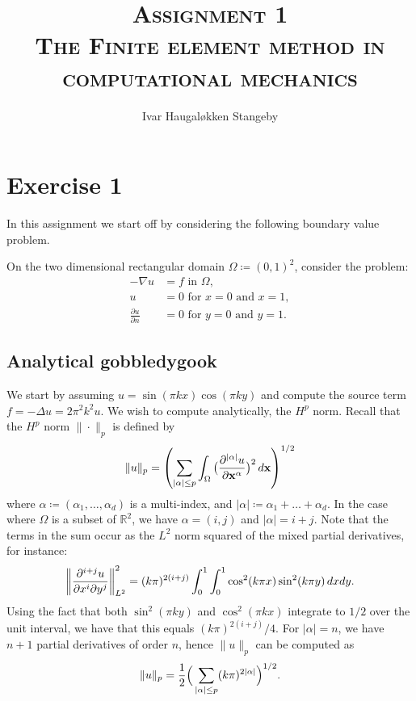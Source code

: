 \documentclass[]{article}
\title{\textsc{Assignment 1 \\ The Finite element method in computational mechanics}}
\author{Ivar Haugaløkken Stangeby}
\newcommand{\lapl}{\Delta}
\newcommand{\x}{\mathbf{x}}
\begin{document}
\maketitle    
\section*{Exercise 1}
\label{sec:formulation_of_problem}

In this assignment we start off by considering the following boundary value
problem.

\begin{BVP}
    \label{bvp:one}
    On the two dimensional rectangular domain $\Omega \coloneqq (0, 1)^2$, consider the
    problem:
    \begin{align}
        \label{eq:problem}
        -\nabla u &= f \text{ in } \Omega,\\ 
        u &= 0 \text{ for } x = 0 \text{ and } x = 1,\\
        \frac{\partial u}{\partial n} &= 0 \text{ for } y = 0 \text{ and } y = 1.
    \end{align}
\end{BVP}

\subsection*{Analytical gobbledygook}
\label{sub:analytical_}


We start by assuming $u = \sin(\pi k x)\cos(\pi k y)$ and compute the source
term $f = -\lapl u = 2\pi^2 k^2 u$.
We wish to compute analytically, the $H^p$ norm.  Recall that the $H^p$  norm
$\| \cdot \|_p$ is defined by
\begin{equation}
    \notag
    \| u \|_p = \left( \sum^{}_{|\alpha|\leq p} \int_\Omega
    \big(\frac{\partial^{|\alpha|} u}{\partial \x^\alpha}\big)^2 \, d\x
\right)^{1/2}
\end{equation}
where $\alpha \coloneqq (\alpha_1, \ldots, \alpha_d)$ is a multi-index, and
$|\alpha| \coloneqq \alpha_1 + \ldots + \alpha_d$. In the case where $\Omega$
is a subset of $\mathbb{R}^2$, we have $\alpha = (i, j)$ and $|\alpha| = i +
j$. Note that the terms in the sum occur as the $L^2$ norm squared of the mixed
partial derivatives, for instance:
\begin{align*}
    \notag
    \left\| \frac{\partial^{i+j}u}{\partial x^i \partial y^j} \right\|_{L^2}^2
    = (k \pi)^{2(i+j)}\int_0^1\int_0^1 \cos^2(k\pi x) \sin^2(k\pi y) \, dx dy.
\end{align*}
Using the fact that both $\sin^2(\pi k y)$ and $\cos^2(\pi k x)$ integrate to
$1/2$ over the unit interval, we have that this equals $(k \pi)^{2(i+j)}/4$.
For $|\alpha| = n$, we have $n + 1$ partial derivatives of order $n$, hence
$\| u\|_p$ can be computed as
\begin{equation}
    \notag
    \| u \|_p = \frac{1}{2} 
    \Big(\sum^{}_{|\alpha| \leq p} (k\pi)^{2|\alpha|}\Big)^{1/2}.
\end{equation}
\end{document}
